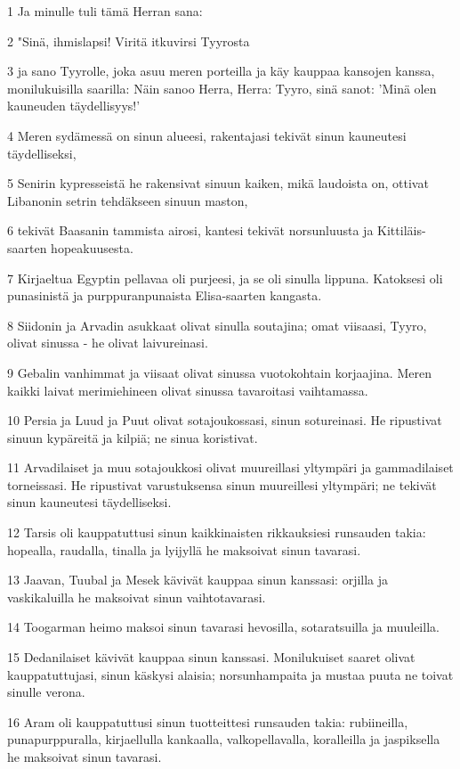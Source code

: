 \par 1 Ja minulle tuli tämä Herran sana:
\par 2 "Sinä, ihmislapsi! Viritä itkuvirsi Tyyrosta
\par 3 ja sano Tyyrolle, joka asuu meren porteilla ja käy kauppaa kansojen kanssa, monilukuisilla saarilla: Näin sanoo Herra, Herra: Tyyro, sinä sanot: 'Minä olen kauneuden täydellisyys!'
\par 4 Meren sydämessä on sinun alueesi, rakentajasi tekivät sinun kauneutesi täydelliseksi,
\par 5 Senirin kypresseistä he rakensivat sinuun kaiken, mikä laudoista on, ottivat Libanonin setrin tehdäkseen sinuun maston,
\par 6 tekivät Baasanin tammista airosi, kantesi tekivät norsunluusta ja Kittiläis-saarten hopeakuusesta.
\par 7 Kirjaeltua Egyptin pellavaa oli purjeesi, ja se oli sinulla lippuna. Katoksesi oli punasinistä ja purppuranpunaista Elisa-saarten kangasta.
\par 8 Siidonin ja Arvadin asukkaat olivat sinulla soutajina; omat viisaasi, Tyyro, olivat sinussa - he olivat laivureinasi.
\par 9 Gebalin vanhimmat ja viisaat olivat sinussa vuotokohtain korjaajina. Meren kaikki laivat merimiehineen olivat sinussa tavaroitasi vaihtamassa.
\par 10 Persia ja Luud ja Puut olivat sotajoukossasi, sinun sotureinasi. He ripustivat sinuun kypäreitä ja kilpiä; ne sinua koristivat.
\par 11 Arvadilaiset ja muu sotajoukkosi olivat muureillasi yltympäri ja gammadilaiset torneissasi. He ripustivat varustuksensa sinun muureillesi yltympäri; ne tekivät sinun kauneutesi täydelliseksi.
\par 12 Tarsis oli kauppatuttusi sinun kaikkinaisten rikkauksiesi runsauden takia: hopealla, raudalla, tinalla ja lyijyllä he maksoivat sinun tavarasi.
\par 13 Jaavan, Tuubal ja Mesek kävivät kauppaa sinun kanssasi: orjilla ja vaskikaluilla he maksoivat sinun vaihtotavarasi.
\par 14 Toogarman heimo maksoi sinun tavarasi hevosilla, sotaratsuilla ja muuleilla.
\par 15 Dedanilaiset kävivät kauppaa sinun kanssasi. Monilukuiset saaret olivat kauppatuttujasi, sinun käskysi alaisia; norsunhampaita ja mustaa puuta ne toivat sinulle verona.
\par 16 Aram oli kauppatuttusi sinun tuotteittesi runsauden takia: rubiineilla, punapurppuralla, kirjaellulla kankaalla, valkopellavalla, koralleilla ja jaspiksella he maksoivat sinun tavarasi.
